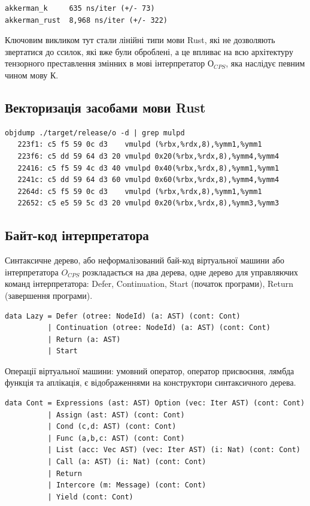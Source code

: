 \begin{definition}
\begin{definition}
\begin{definition}
\begin{definition}
\begin{lstlisting}
akkerman_k     635 ns/iter (+/- 73)
akkerman_rust  8,968 ns/iter (+/- 322)
\end{lstlisting}

Ключовим викликом тут стали лінійні типи мови Rust, які не дозволяють
звертатися до ссилок, які вже були оброблені, а це впливає на всю
архітектуру тензорного преставлення змінних в мові інтерпретатор $О_{CPS}$,
яка наслідує певним чином мову К.

\subsection{Векторизація засобами мови Rust}

\begin{lstlisting}
objdump ./target/release/o -d | grep mulpd
   223f1: c5 f5 59 0c d3    vmulpd (%rbx,%rdx,8),%ymm1,%ymm1
   223f6: c5 dd 59 64 d3 20 vmulpd 0x20(%rbx,%rdx,8),%ymm4,%ymm4
   22416: c5 f5 59 4c d3 40 vmulpd 0x40(%rbx,%rdx,8),%ymm1,%ymm1
   2241c: c5 dd 59 64 d3 60 vmulpd 0x60(%rbx,%rdx,8),%ymm4,%ymm4
   2264d: c5 f5 59 0c d3    vmulpd (%rbx,%rdx,8),%ymm1,%ymm1
   22652: c5 e5 59 5c d3 20 vmulpd 0x20(%rbx,%rdx,8),%ymm3,%ymm3
\end{lstlisting}

\subsection{Байт-код інтерпретатора}

Синтаксичне дерево, або неформалізований бай-код віртуальної
машини або інтерпретатора $O_{CPS}$ розкладається на два дерева, одне дерево
для управляючих команд інтерпретатора: Defer, Continuation, Start (початок програми),
Return (завершення програми).

\begin{lstlisting}
data Lazy = Defer (otree: NodeId) (a: AST) (cont: Cont)
          | Continuation (otree: NodeId) (a: AST) (cont: Cont)
          | Return (a: AST)
          | Start
\end{lstlisting}

Операції віртуальної машини: умовний оператор, оператор присвоєння, лямбда
функція та аплікація, є відображеннями на конструктори синтаксичного дерева.

\begin{lstlisting}
data Cont = Expressions (ast: AST) Option (vec: Iter AST) (cont: Cont)
          | Assign (ast: AST) (cont: Cont)
          | Cond (c,d: AST) (cont: Cont)
          | Func (a,b,c: AST) (cont: Cont)
          | List (acc: Vec AST) (vec: Iter AST) (i: Nat) (cont: Cont)
          | Call (a: AST) (i: Nat) (cont: Cont)
          | Return
          | Intercore (m: Message) (cont: Cont)
          | Yield (cont: Cont)
\end{lstlisting}



\end{definition}
\end{definition}
\end{definition}
\end{definition}
